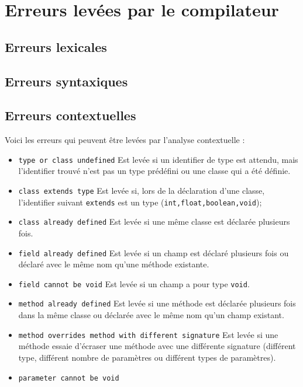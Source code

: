 \documentclass[a4paper]{article}
\begin{document}
\section{Erreurs levées par le compilateur}
\subsection{Erreurs lexicales}
\subsection{Erreurs syntaxiques}
\subsection{Erreurs contextuelles}
Voici les erreurs qui peuvent être levées par l'analyse contextuelle :
\begin{itemize}
\item \texttt{type or class undefined} \newline
Est levée si un identifier de type est attendu, mais l'identifier trouvé n'est pas un type prédéfini ou une classe qui a été définie.
\item \texttt{class extends type}
\newline
Est levée si, lors de la déclaration d'une classe, l'identifier suivant \texttt{extends} est un type (\texttt{int,float,boolean,void});
\item \texttt{class already defined}
\newline
Est levée si une même classe est déclarée plusieurs fois.
\item \texttt{field already defined}
\newline
Est levée si un champ est déclaré plusieurs fois ou déclaré avec le même nom qu'une méthode existante.
\item \texttt{field cannot be void}
\newline
Est levée si un champ a pour type \texttt{void}.
\item \texttt{method already defined}
\newline
Est levée si une méthode est déclarée plusieurs fois dans la même classe ou déclarée avec le même nom qu'un champ existant.
\item \texttt{method overrides method with different signature}
\newline
Est levée si une méthode essaie d'écraser une méthode avec une différente signature (différent type, différent nombre de paramètres ou diff\'erent types de paramètres).
\item \texttt{parameter cannot be void}

\end{itemize}
\end{document}
